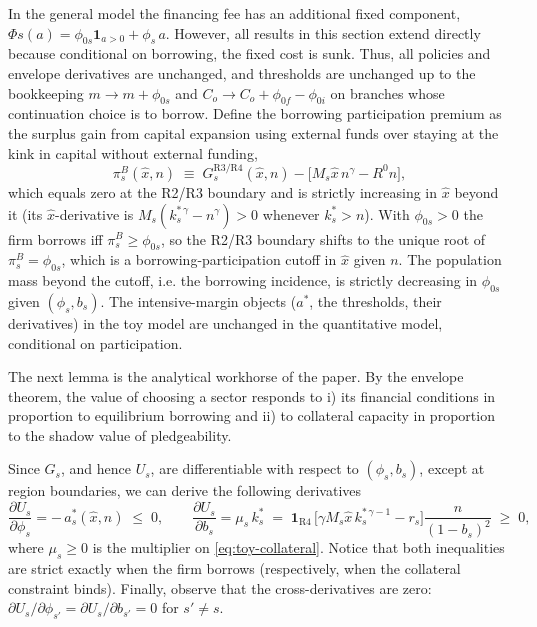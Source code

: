 \documentclass[12pt]{article}
\begin{document}
\begin{remark}
\label{rem:toy-participation}
In the general model the financing fee has an additional fixed component, $\Phi{s}(a)=\phi_{0s}\mathbf{1}_{a>0}+\phi_{s}\,a$. However, all results in this section extend directly because conditional on borrowing, the fixed cost is sunk. Thus, all policies and envelope derivatives are unchanged, and thresholds are unchanged up to the bookkeeping $m \rightarrow m + \phi_{0s}$ and $C_o \rightarrow C_o + \phi_{0f} - \phi_{0i}$ on branches whose continuation choice is to borrow. Define the borrowing participation premium as the surplus gain from capital expansion using external funds over staying at the kink in capital without external funding,
\begin{equation*}
  \pi^{B}_{s}(\hat x,n)\;\equiv\;
  G_{s}^{\mathrm{R3/R4}}(\hat x,n)
  -\big[M_{s}\hat x\,n^{\gamma}-R^0 n\big],
\end{equation*}
which equals zero at the R2/R3 boundary and is strictly increasing in $\hat x$ beyond it (its $\hat x$-derivative is $M_{s}(k^{*\,\gamma}_{s}-n^{\gamma})>0$ whenever $k^{*}_{s}>n$). With $\phi_{0s}>0$ the firm borrows iff $\pi^{B}_{s}\geq\phi_{0s}$, so the R2/R3 boundary shifts to the unique root of $\pi^{B}_{s}=\phi_{0s}$, which is a borrowing-participation cutoff in $\hat x$ given $n$. The population mass beyond the cutoff, i.e. the borrowing incidence, is strictly decreasing in $\phi_{0s}$ given $(\phi_{s},b_{s})$. The intensive-margin objects ($a^{*}$, the thresholds, their derivatives) in the toy model are unchanged in the quantitative model, conditional on participation.
\end{remark}

The next lemma is the analytical workhorse of the paper. By the envelope theorem, the value of choosing a sector responds to i) its financial conditions in proportion to equilibrium borrowing and ii) to collateral capacity in proportion to the shadow value of pledgeability.
 
\begin{lemma}
\label{lem:envelope}
Since $G_{s}$, and hence $U_{s}$, are differentiable with respect to $(\phi_{s},b_{s})$, except at region boundaries, we can derive the following derivatives
\begin{equation}
  \frac{\partial U_{s}}{\partial \phi_{s}}
  = -\,a^{*}_{s}(\hat x,n)\;\leq\;0,
  \qquad
  \frac{\partial U_{s}}{\partial b_{s}}
  = \mu_{s}\,k^{*}_{s} \;=\;
  \mathbf{1}_{\mathrm{R4}}\,
  \Big[\gamma M_{s}\hat x\,k^{*\,\gamma-1}_{s}-r_{s}\Big]
  \frac{n}{(1- b_{s})^{2}}\;\geq\;0,
  \label{eq:toy-envelope}
\end{equation}
where $\mu_{s}\geq0$ is the multiplier on \eqref{eq:toy-collateral}. Notice that both inequalities are strict exactly when the firm borrows (respectively, when the collateral constraint binds). Finally, observe that the cross-derivatives are zero: $\partial U_{s}/\partial\phi_{s'}=\partial U_{s}/\partial b_{s'}=0$ for $s'\neq s$.
\end{lemma}
\end{document}
